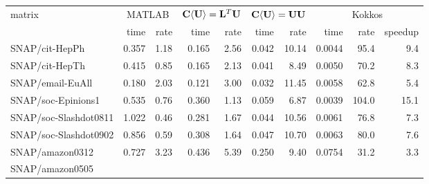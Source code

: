 \documentclass[12pt]{article}
\begin{document}
\hspace{-1in}
{\footnotesize
\begin{tabular}{|l|rr|rr|rr||rrr|}
\hline
matrix %
& \multicolumn{2}{|c|}{MATLAB}  %
& \multicolumn{2}{|c|}{${ \bf C \langle U \rangle} = {\bf L}^T{\bf U}$}
& \multicolumn{2}{|c||}{${\bf C \langle U \rangle} = {\bf UU}$}
& \multicolumn{3}{|c|}{Kokkos} \\
& time & rate & time & rate & time & rate & time & rate & speedup \\
\hline
SNAP/cit-HepPh & %
    0.357  &     1.18 &  %
    0.165  &     2.56 &  %
    0.042  &    10.14 &  %
    0.0044 &     95.4 &      9.4 \\ %
SNAP/cit-HepTh & %
    0.415  &     0.85 &  %
    0.165  &     2.13 &  %
    0.041  &     8.49 &  %
    0.0050 &     70.2 &      8.3 \\ %
SNAP/email-EuAll & %
    0.180  &     2.03 &  %
    0.121  &     3.00 &  %
    0.032  &    11.45 &  %
    0.0058 &     62.8 &      5.4 \\ %
SNAP/soc-Epinions1 & %
    0.535  &     0.76 &  %
    0.360  &     1.13 &  %
    0.059  &     6.87 &  %
    0.0039 &    104.0 &     15.1 \\ %
SNAP/soc-Slashdot0811 & %
    1.022  &     0.46 &  %
    0.281  &     1.67 &  %
    0.044  &    10.56 &  %
    0.0061 &     76.8 &      7.3 \\ %
SNAP/soc-Slashdot0902 & %
    0.856  &     0.59 &  %
    0.308  &     1.64 &  %
    0.047  &    10.70 &  %
    0.0063 &    80.0  &     7.6 \\ %
SNAP/amazon0312 & %
    0.727  &     3.23 &  %
    0.436  &     5.39 &  %
    0.250  &     9.40 &  %
    0.0754 &    31.2  &      3.3 \\ %
SNAP/amazon0505 & %

\end{tabular}}
\end{document}
